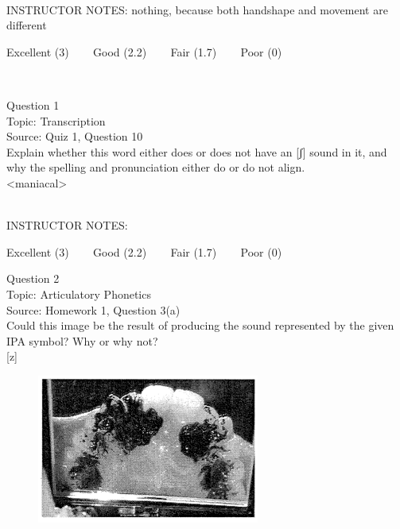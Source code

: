 \documentclass[12pt]{article}
\begin{document}
~\\
INSTRUCTOR NOTES: nothing, because both handshape and movement are different


\vfill
Excellent (3) ~~~ Good (2.2) ~~~ Fair (1.7) ~~~ Poor (0)
\newpage

\begin{center}
\textbf{{\color{red}{\HUGE END OF EXAM}}}\\

\end{center}
\newpage

\begin{center}
\textbf{{\color{blue}{\HUGE START OF EXAM\\}}}

\textbf{{\color{blue}{\HUGE Student ID: 97077\\}}}

\textbf{{\color{blue}{\HUGE \\}}}

\end{center}
\newpage

{\large Question 1}\\

Topic: Transcription\\
Source: Quiz 1, Question 10\\

Explain whether this word either does or does not have an [ʃ] sound in it, and why the spelling and pronunciation either do or do not align.\\

<maniacal>


~\\
INSTRUCTOR NOTES: 


\vfill
Excellent (3) ~~~ Good (2.2) ~~~ Fair (1.7) ~~~ Poor (0)
\newpage

{\large Question 2}\\

Topic: Articulatory Phonetics\\
Source: Homework 1, Question 3(a)\\

Could this image be the result of producing the sound represented by the given IPA symbol? Why or why not?\\

{[z]}

\begin{figure}[H]
\includegraphics{../images/staticpalatography_fricative.png}
\end{figure}
\end{document}
